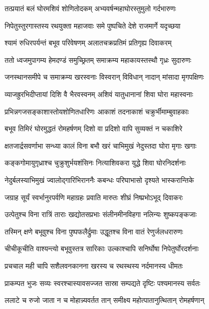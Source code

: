 
\twolineshloka
{तत्प्रयातं बलं घोरमशिवं शोणितोदकम्}
{अभ्यवर्षन्महाघोरस्तुमुलो गर्दभारुणः} %

\twolineshloka
{निपेतुस्तुरगास्तस्य रथयुक्ता महाजवाः}
{समे पुष्पचिते देशे राजमार्गे यदृच्छया} %

\twolineshloka
{श्यामं रुधिरपर्यन्तं बभूव परिवेषणम्}
{अलातचक्रप्रतिमं प्रतिगृह्य दिवाकरम्} %

\twolineshloka
{ततो ध्वजमुपागम्य हेमदण्डं समुच्छ्रितम्}
{समाक्रम्य महाकायस्तस्थौ गृध्रः सुदारुणः} %

\twolineshloka
{जनस्थानसमीपे च समाक्रम्य खरस्वनाः}
{विस्वरान् विविधान् नादान् मांसादा मृगपक्षिणः} %

\twolineshloka
{व्याजह्रुरभिदीप्तायां दिशि वै भैरवस्वनम्}
{अशिवं यातुधानानां शिवा घोरा महास्वनाः} %

\twolineshloka
{प्रभिन्नगजसङ्काशास्तोयशोणितधारिणः}
{आकाशं तदनाकाशं चक्रुर्भीमाम्बुवाहकाः} %

\twolineshloka
{बभूव तिमिरं घोरमुद्धतं रोमहर्षणम्}
{दिशो वा प्रदिशो वापि सुव्यक्तं न चकाशिरे} %

\twolineshloka
{क्षतजार्द्रसवर्णाभा सन्ध्या कालं विना बभौ}
{खरं चाभिमुखं नेदुस्तदा घोरा मृगाः खगाः} %

\twolineshloka
{कङ्कगोमायुगृध्राश्च चुक्रुशुर्भयशंसिनः}
{नित्याशिवकरा युद्धे शिवा घोरनिदर्शनाः} %

\twolineshloka
{नेदुर्बलस्याभिमुखं ज्वालोद्गारिभिराननैः}
{कबन्धः परिघाभासो दृश्यते भास्करान्तिके} %

\twolineshloka
{जग्राह सूर्यं स्वर्भानुरपर्वणि महाग्रहः}
{प्रवाति मारुतः शीघ्रं निष्प्रभोऽभूद् दिवाकरः} %

\twolineshloka
{उत्पेतुश्च विना रात्रिं ताराः खद्योतसप्रभाः}
{संलीनमीनविहगा नलिन्यः शुष्कपङ्कजाः} %

\twolineshloka
{तस्मिन् क्षणे बभूवुश्च विना पुष्पफलैर्द्रुमाः}
{उद्धूतश्च विना वातं रेणुर्जलधरारुणः} %

\twolineshloka
{चीचीकूचीति वाश्यन्त्यो बभूवुस्तत्र सारिकाः}
{उल्काश्चापि सनिर्घोषा निपेतुर्घोरदर्शनाः} %

\twolineshloka
{प्रचचाल मही चापि सशैलवनकानना}
{खरस्य च रथस्थस्य नर्दमानस्य धीमतः} %

\twolineshloka
{प्राकम्पत भुजः सव्यः स्वरश्चास्यावसज्जत}
{सास्रा सम्पद्यते दृष्टिः पश्यमानस्य सर्वतः} %

\twolineshloka
{ललाटे च रुजो जाता न च मोहान्न्यवर्तत}
{तान् समीक्ष्य महोत्पातानुत्थितान् रोमहर्षणान्} %

